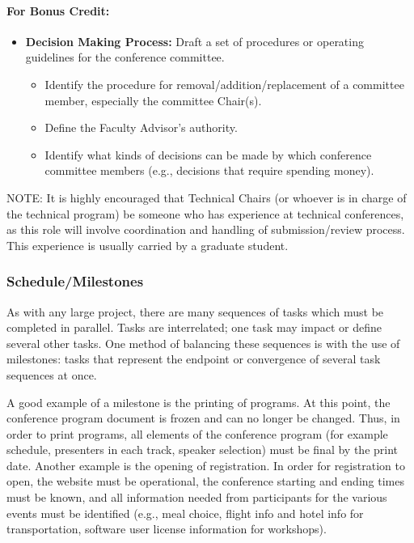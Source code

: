 \documentclass[12pt]{article}
\begin{document}
\paragraph{For Bonus Credit:}
\begin{itemize}
\item{\textbf{Decision Making Process:} Draft a set of procedures or operating guidelines for
the conference committee.
\begin{itemize}
\item{Identify the procedure for removal/addition/replacement of a committee member, especially the committee Chair(s).}
\item{Define the Faculty Advisor’s authority.}
\item{Identify what kinds of decisions can be made by which conference committee members (e.g., decisions that require spending money).}
\end{itemize}
}
\end{itemize}

NOTE: It is highly encouraged that Technical Chairs (or whoever is in charge of the technical program) be someone who has experience at technical conferences, as this role will involve coordination and handling of submission/review process. This experience is usually carried by a graduate student.

\subsubsection{Schedule/Milestones}
As with any large project, there are many sequences of tasks which must be completed in
parallel. Tasks are interrelated; one task may impact or define several other tasks. One
method of balancing these sequences is with the use of milestones: tasks that represent
the endpoint or convergence of several task sequences at once.

A good example of a milestone is the printing of programs. At this point, the conference
program document is frozen and can no longer be changed. Thus, in order to print
programs, all elements of the conference program (for example schedule, presenters in
each track, speaker selection) must be final by the print date. Another example is the
opening of registration. In order for registration to open, the website must be operational,
the conference starting and ending times must be known, and all information needed from
participants for the various events must be identified (e.g., meal choice, flight info and
hotel info for transportation, software user license information for workshops).
\end{document}
